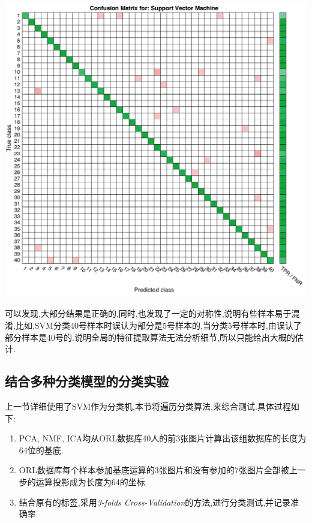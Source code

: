 	\begin{center}
	\begin{minipage}[t]{\linewidth}
	\center
	{
	\includegraphics[width=\MyFactor\textwidth]{Img/svm_confuse} 
	}
	\end{minipage}
	\medskip
	\end{center}
	可以发现,大部分结果是正确的,同时,也发现了一定的对称性,说明有些样本易于混淆,比如,SVM分类40号样本时误认为部分是5号样本的,当分类5号样本时,由误认了部分样本是40号的.说明全局的特征提取算法无法分析细节,所以只能给出大概的估计.
	

\subsection{结合多种分类模型的分类实验}

上一节详细使用了SVM作为分类机,本节将遍历分类算法,来综合测试.具体过程如下:
	\begin{enumerate}
		\item PCA, NMF, ICA均从ORL数据库40人的前3张图片计算出该组数据库的长度为64位的基底.
		\item ORL数据库每个样本参加基底运算的3张图片和没有参加的7张图片全部被上一步的运算投影成为长度为64的坐标
		\item 结合原有的标签,采用\textit{3-folds Cross-Validation}的方法,进行分类测试,并记录准确率
	\end{enumerate}




